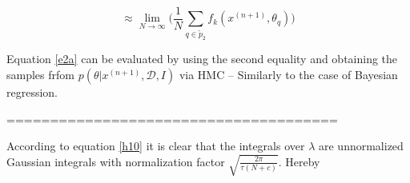 \begin{equation}
	\approx  \lim\limits_{N\rightarrow \infty}\bigg(\frac{1}{N}\sum_{q\in \tilde{p}_2}f_k(x^{(n+1)},\theta_q)\bigg)
\end{equation}






Equation \eqref{e2a} can be evaluated by using the second equality and obtaining the samples frfom $p(\theta|x^{(n+1)},\mathcal{D},I)$ via HMC -- Similarly to the case of Bayesian regression. 


======================================

According to equation \eqref{h10} it is clear that the integrals over $\lambda$ are unnormalized Gaussian integrals with normalization factor $\sqrt{\frac{2\pi}{\tau(N+c)}}$. Hereby





